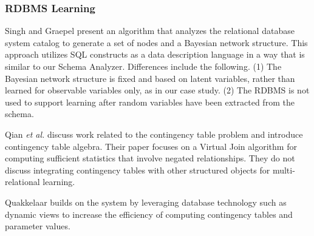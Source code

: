 \subsubsection{RDBMS Learning}
Singh and Graepel \cite{Singh2013} present an algorithm that analyzes the relational database system catalog to generate a set of nodes and a Bayesian network structure. 
This approach utilizes SQL constructs as a data description language in a way that is similar to our Schema Analyzer. 
Differences include the following. (1) The Bayesian network structure is fixed and based on latent variables, rather than learned for observable variables only, as in our case study. (2) The RDBMS is not used to support learning after random variables have been extracted from the schema. 

Qian {\em et al.} \cite{Qian2014a}  discuss work related to the contingency table problem and introduce contingency table algebra. Their paper focuses on a Virtual Join algorithm for computing sufficient statistics that involve negated relationships. They do not discuss integrating contingency tables with other structured objects for multi-relational learning. 
%

Quakkelaar \cite{Quakkelaar2017} builds on the \FB system by leveraging database technology such as dynamic views to increase the efficiency of computing contingency tables and parameter values. 

